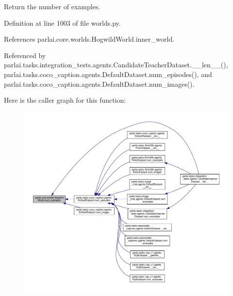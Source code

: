\begin{DoxyVerb}Return the number of examples.\end{DoxyVerb}
 

Definition at line 1003 of file worlds.\+py.



References parlai.\+core.\+worlds.\+Hogwild\+World.\+inner\+\_\+world.



Referenced by parlai.\+tasks.\+integration\+\_\+tests.\+agents.\+Candidate\+Teacher\+Dataset.\+\_\+\+\_\+len\+\_\+\+\_\+(), parlai.\+tasks.\+coco\+\_\+caption.\+agents.\+Default\+Dataset.\+num\+\_\+episodes(), and parlai.\+tasks.\+coco\+\_\+caption.\+agents.\+Default\+Dataset.\+num\+\_\+images().

Here is the caller graph for this function\+:
\nopagebreak
\begin{figure}[H]
\begin{center}
\leavevmode
\includegraphics[width=350pt]{classparlai_1_1core_1_1worlds_1_1HogwildWorld_ae488971481ec6c8ba803b2404ad70e56_icgraph}
\end{center}
\end{figure}
\mbox{\label{classparlai_1_1core_1_1worlds_1_1HogwildWorld_a9853e25a58444d4516c3f6da8c44d9c2}} 
